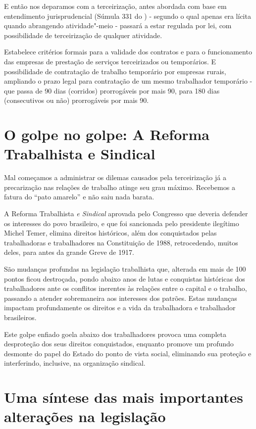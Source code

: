 E então nos deparamos com a terceirização, antes abordada com base em
entendimento jurisprudencial (Súmula 331 do ) - segundo o qual apenas
era lícita quando abrangendo atividade"-meio - passará a estar regulada
por lei, com possibilidade de terceirização de qualquer atividade.

Estabelece critérios formais para a validade dos contratos e para o
funcionamento das empresas de prestação de serviços terceirizados ou
temporários. E possibilidade de contratação de trabalho temporário por
empresas rurais, ampliando o prazo legal para contratação de um mesmo
trabalhador temporário - que passa de 90 dias (corridos) prorrogáveis
por mais 90, para 180 dias (consecutivos ou não) prorrogáveis por mais
90.

\section{O golpe no golpe: A Reforma Trabalhista e Sindical}

Mal começamos a administrar os dilemas causados pela terceirização já a
precarização nas relações de trabalho atinge seu grau máximo. Recebemos
a fatura do ``pato amarelo'' e não saiu nada barata.

A Reforma Trabalhista \emph{e Sindical} aprovada pelo Congresso que
deveria defender os interesses do povo brasileiro, e que foi sancionada
pelo presidente ilegítimo Michel Temer, elimina direitos históricos,
além dos conquistados pelas trabalhadoras e trabalhadores na
Constituição de 1988, retrocedendo, muitos deles, para antes da grande
Greve de 1917.

São mudanças profundas na legislação trabalhista que, alterada em mais
de 100 pontos ficou destroçada, pondo abaixo anos de lutas e conquistas
históricas dos trabalhadores ante os conflitos inerentes às relações
entre o capital e o trabalho, passando a atender sobremaneira aos
interesses dos patrões. Estas mudanças impactam profundamente os
direitos e a vida da trabalhadora e trabalhador brasileiros.

Este golpe enfiado goela abaixo dos trabalhadores provoca uma completa
desproteção dos seus direitos conquistados, enquanto promove um profundo
desmonte do papel do Estado do ponto de vista social, eliminando sua
proteção e interferindo, inclusive, na organização sindical.

\section{Uma síntese das mais importantes alterações na legislação}


